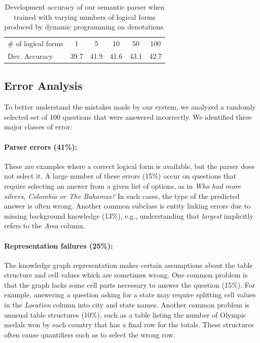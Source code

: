 \begin{table}
	\centering
	\begin{tabular}{lccccc} \toprule
	\# of logical forms & 1 & 5 & 10 & 50 & 100 \\
	Dev. Accuracy & 39.7 & 41.9 & 41.6 & 43.1 & 42.7 \\ \bottomrule
	\end{tabular}
	\caption{Development accuracy of our semantic parser when trained with
	varying numbers of logical forms produced by dynamic programming on
	denotations.}\label{tab:dpd_results}
\end{table}

\subsection{Error Analysis}

To better understand the mistakes made by our system, we analyzed a randomly
selected set of 100 questions that were answered incorrectly. We identified
three major classes of error:

\paragraph{Parser errors (41\%):} These are examples where a correct logical
form is available, but the parser does not select it. A large number of these
errors (15\%) occur on questions that require selecting an answer from a given
list of options, as in \textit{Who had more silvers, Colombia or The Bahamas?}
In such cases, the type of the predicted answer is often wrong. Another common
subclass is entity linking errors due to missing background knowledge (13\%),
e.g., understanding that \textit{largest} implicitly refers to the \textit{Area}
column.

\paragraph{Representation failures (25\%):} The knowledge graph representation
makes certain assumptions about the table structure and cell values which are
sometimes wrong. One common problem is that the graph lacks some cell parts
necessary to answer the question (15\%). For example, answering a question
asking for a state may require splitting cell values in the \textit{Location}
column into city and state names. Another common problem is unusual table
structures (10\%), such as a table listing the number of Olympic medals won by
each country that has a final row for the totals. These structures often cause
quantifiers such as  to select the wrong row.

